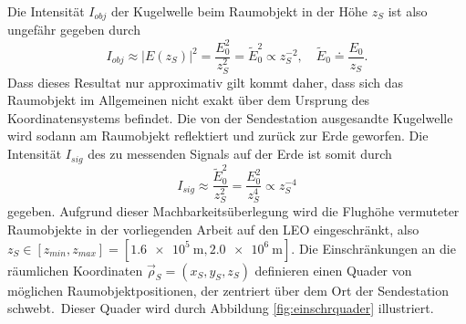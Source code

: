 \documentclass[a4paper,12pt]{article}
\numberwithin{equation}{section}
\begin{document}
\begin{equation}
\end{equation} Die Intensität $I_{obj}$ der Kugelwelle beim Raumobjekt in der Höhe $z_S$ ist also ungefähr gegeben durch \begin{equation}I_{obj} \approx |E(z_S)|^2 = \frac{E_0^2}{z_S^2} = \tilde{E}_0^2 \propto z_S^{-2}, \quad \tilde{E}_0 \doteq \frac{E_0}{z_S}.\end{equation} Dass dieses Resultat nur approximativ gilt kommt daher, dass sich das Raumobjekt im Allgemeinen nicht exakt über dem Ursprung des Koordinatensystems befindet. Die von der Sendestation ausgesandte Kugelwelle wird sodann am Raumobjekt reflektiert und zurück zur Erde geworfen. Die Intensität $I_{sig}$ des zu messenden Signals auf der Erde ist somit durch \begin{equation} I_{sig} \approx \frac{\tilde{E}_0^2}{z_S^2} = \frac{E_0^2}{z_S^4}\propto z_S^{-4} \end{equation} gegeben. Aufgrund dieser Machbarkeitsüberlegung wird die Flughöhe vermuteter Raumobjekte in der vorliegenden Arbeit auf den LEO eingeschränkt, also $z_S \in [z_{min},z_{max}]=[\SI{1.6e5}{\meter},\SI{2.0e6}{\meter}]$. Die Einschränkungen an die räumlichen Koordinaten $\vec{\rho}_S = (x_S,y_S,z_S)$ definieren einen Quader von möglichen Raumobjektpositionen, der zentriert über dem Ort der Sendestation \flqq schwebt\frqq.\ Dieser Quader wird durch Abbildung \ref{fig:einschrquader} illustriert.
\end{document}
